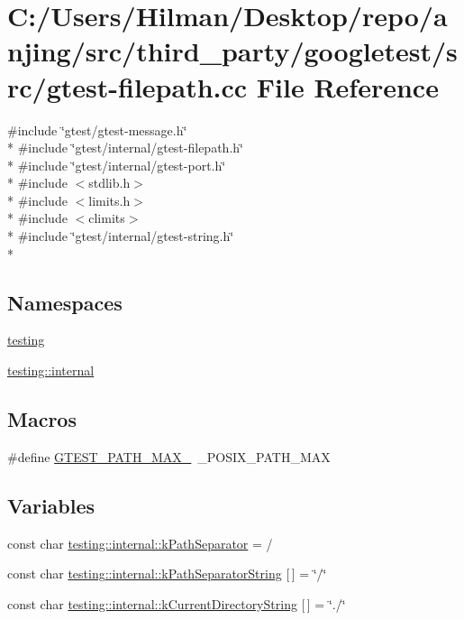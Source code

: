 \hypertarget{gtest-filepath_8cc}{}\section{C\+:/\+Users/\+Hilman/\+Desktop/repo/anjing/src/third\+\_\+party/googletest/src/gtest-\/filepath.cc File Reference}
\label{gtest-filepath_8cc}
{\ttfamily \#include \char`\"{}gtest/gtest-\/message.\+h\char`\"{}}\\*
{\ttfamily \#include \char`\"{}gtest/internal/gtest-\/filepath.\+h\char`\"{}}\\*
{\ttfamily \#include \char`\"{}gtest/internal/gtest-\/port.\+h\char`\"{}}\\*
{\ttfamily \#include $<$stdlib.\+h$>$}\\*
{\ttfamily \#include $<$limits.\+h$>$}\\*
{\ttfamily \#include $<$climits$>$}\\*
{\ttfamily \#include \char`\"{}gtest/internal/gtest-\/string.\+h\char`\"{}}\\*
\subsection*{Namespaces}
\begin{DoxyCompactItemize}
\item 
 \hyperlink{namespacetesting}{testing}
\item 
 \hyperlink{namespacetesting_1_1internal}{testing\+::internal}
\end{DoxyCompactItemize}
\subsection*{Macros}
\begin{DoxyCompactItemize}
\item 
\#define \hyperlink{gtest-filepath_8cc_ad9d445747785a9271a57cf1d392b89ad}{G\+T\+E\+S\+T\+\_\+\+P\+A\+T\+H\+\_\+\+M\+A\+X\+\_\+}~\+\_\+\+P\+O\+S\+I\+X\+\_\+\+P\+A\+T\+H\+\_\+\+M\+A\+X
\end{DoxyCompactItemize}
\subsection*{Variables}
\begin{DoxyCompactItemize}
\item 
const char \hyperlink{namespacetesting_1_1internal_afcd71adaa9d1e6df7b282a17fc48125c}{testing\+::internal\+::k\+Path\+Separator} = \textquotesingle{}/\textquotesingle{}
\item 
const char \hyperlink{namespacetesting_1_1internal_ab8904ed136370f97cef4fd6d9eeb8439}{testing\+::internal\+::k\+Path\+Separator\+String} \mbox{[}$\,$\mbox{]} = \char`\"{}/\char`\"{}
\item 
const char \hyperlink{namespacetesting_1_1internal_a23a8e9527d0e544e7df2d64ad549ce3e}{testing\+::internal\+::k\+Current\+Directory\+String} \mbox{[}$\,$\mbox{]} = \char`\"{}./\char`\"{}
\end{DoxyCompactItemize}


